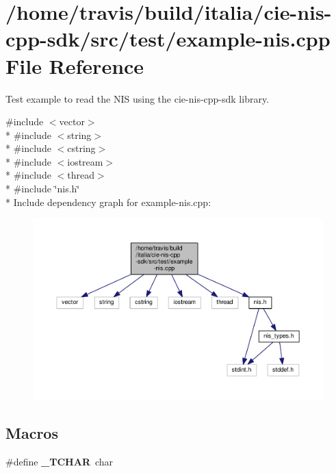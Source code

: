 \hypertarget{example-nis_8cpp}{\section{/home/travis/build/italia/cie-\/nis-\/cpp-\/sdk/src/test/example-\/nis.cpp File Reference}
\label{example-nis_8cpp}
}


Test example to read the N\-I\-S using the cie-\/nis-\/cpp-\/sdk library.  


{\ttfamily \#include $<$vector$>$}\\*
{\ttfamily \#include $<$string$>$}\\*
{\ttfamily \#include $<$cstring$>$}\\*
{\ttfamily \#include $<$iostream$>$}\\*
{\ttfamily \#include $<$thread$>$}\\*
{\ttfamily \#include \char`\"{}nis.\-h\char`\"{}}\\*
Include dependency graph for example-\/nis.cpp\-:
\nopagebreak
\begin{figure}[H]
\begin{center}
\leavevmode
\includegraphics[width=350pt]{example-nis_8cpp__incl}
\end{center}
\end{figure}
\subsection*{Macros}
\begin{DoxyCompactItemize}
\item 
\hypertarget{example-nis_8cpp_ab2c1cde97318da5dda261ee4e42c2412}{\#define {\bfseries \-\_\-\-T\-C\-H\-A\-R}~char}\label{example-nis_8cpp_ab2c1cde97318da5dda261ee4e42c2412}

\end{DoxyCompactItemize}
